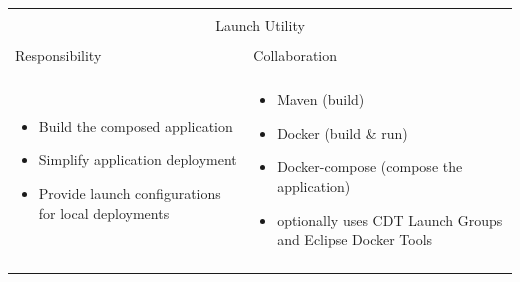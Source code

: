 \vspace{0.5cm} \noindent        
\begin{tabular}{|l|l|}
    \cline{1-2}
    \multicolumn{2}{|c|}{} \\[-0.3cm]
    \multicolumn{2}{|c|}{Launch Utility} \\ 
    \multicolumn{2}{|c|}{} \\[-0.3cm]
    \cline{1-2}
    Responsibility & Collaboration \\
    \cline{1-2}
    & \\[-0.2cm]
    \begin{minipage}{0.47\textwidth}
        \begin{itemize}
          	\item Build the composed application
			\item Simplify application deployment
          	\item Provide launch configurations for local deployments 
        \end{itemize} 
    \end{minipage}
	&
    \begin{minipage}{0.47\textwidth}
        \begin{itemize}
          \item Maven (build)
          \item Docker (build \& run)
          \item Docker-compose (compose the application)
          \item optionally uses CDT Launch Groups and Eclipse Docker Tools
        \end{itemize} 
    \end{minipage}
	\\ & \\
    \hline
\end{tabular}
